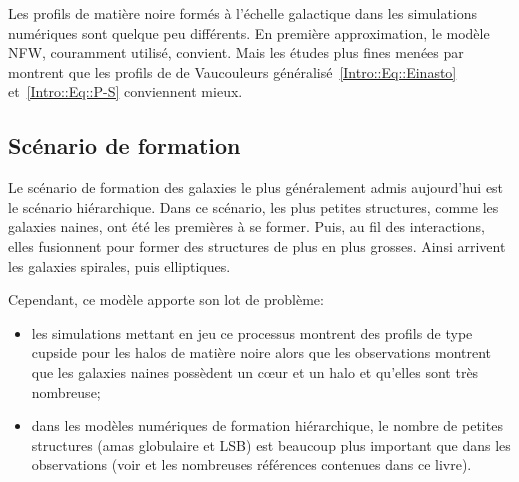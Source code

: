 			Les profils de matière noire formés à l'échelle
			galactique dans les simulations numériques sont quelque
			peu différents. En première approximation, le modèle
			NFW, couramment utilisé, convient. Mais les études plus
			fines menées par \cite{2006AJ....132.2685M,2006AJ....132.2701G,2006AJ....132.2711G} montrent que
			les profils de de Vaucouleurs généralisé~\ref{Intro::Eq::Einasto} et~\ref{Intro::Eq::P-S} conviennent mieux.


		\subsection{Scénario de formation}
			Le scénario de formation des galaxies le plus généralement admis aujourd'hui est le scénario
			hiérarchique. Dans ce scénario, les plus petites structures, comme les galaxies naines, ont
			été les premières à se former. Puis, au fil des interactions, elles fusionnent pour former
			des structures de plus en plus grosses. Ainsi arrivent les galaxies spirales, puis
			elliptiques.


			Cependant, ce modèle apporte son lot de problème:
			\begin{itemize}
				\item les simulations mettant en jeu ce processus montrent des profils de type cupside pour les halos de matière noire
					alors que les observations montrent que les galaxies naines possèdent un cœur et un halo et qu'elles sont très
					nombreuse;
				\item dans les modèles numériques de formation hiérarchique, le nombre de petites
					structures (amas globulaire et LSB) est beaucoup plus important que dans les
					observations (voir \citet{2006CombesBook} et les nombreuses références contenues dans ce livre).
			\end{itemize}

